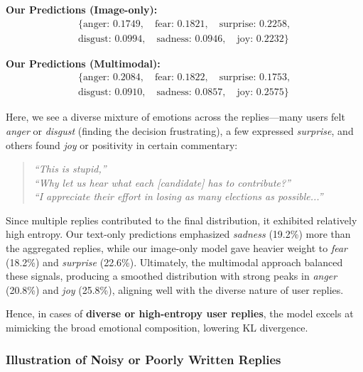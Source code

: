 \noindent\textbf{Our Predictions (Image-only):}
\[
\begin{aligned}
\{\text{anger: } 0.1749, \quad \text{fear: } 0.1821, \quad \text{surprise: } 0.2258, \\
\text{disgust: } 0.0994, \quad \text{sadness: } 0.0946, \quad \text{joy: } 0.2232\}
\end{aligned}
\]

\noindent\textbf{Our Predictions (Multimodal):}
\[
\begin{aligned}
\{\text{anger: } 0.2084, \quad \text{fear: } 0.1822, \quad \text{surprise: } 0.1753, \\
\text{disgust: } 0.0910, \quad \text{sadness: } 0.0857, \quad \text{joy: } 0.2575\}
\end{aligned}
\]

Here, we see a diverse mixture of emotions across the replies—many users felt \emph{anger} or \emph{disgust} (finding the decision frustrating), a few expressed \emph{surprise}, and others found \textit{joy} or positivity in certain commentary:

\begin{quote}
\emph{``This is stupid,''} \\
\emph{``Why let us hear what each [candidate] has to contribute?''} \\
\emph{``I appreciate their effort in losing as many elections as possible...''}
\end{quote}

Since multiple replies contributed to the final distribution, it exhibited relatively high entropy. Our text-only predictions emphasized \textit{sadness} (19.2\%) more than the aggregated replies, while our image-only model gave heavier weight to \textit{fear} (18.2\%) and \textit{surprise} (22.6\%). Ultimately, the multimodal approach balanced these signals, producing a smoothed distribution with strong peaks in \textit{anger} (20.8\%) and \textit{joy} (25.8\%), aligning well with the diverse nature of user replies.
\newline

Hence, in cases of \textbf{diverse or high-entropy user replies}, the model excels at mimicking the broad emotional composition, lowering KL divergence.

\vspace{1em}
\subsubsection*{Illustration of Noisy or Poorly Written Replies}

